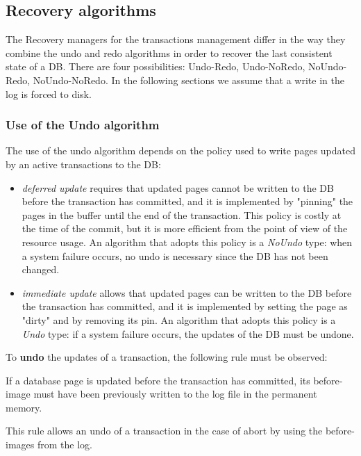 \subsection{Recovery algorithms}
The Recovery managers for the transactions management differ in the way they combine the undo and redo algorithms in order to recover the last consistent state of a DB. There are four possibilities: Undo-Redo, Undo-NoRedo, NoUndo-Redo, NoUndo-NoRedo. In the following sections we assume that a write in the log is forced to disk.

\subsubsection{Use of the Undo algorithm}
The use of the undo algorithm depends on the policy used to write pages updated by an active transactions to the DB:

\begin{itemize}

    \item \textit{deferred update} requires that updated pages cannot be written to the DB before the transaction has committed, and it is implemented by "pinning" the pages in the buffer until the end of the transaction. This policy is costly at the time of the commit, but it is more efficient from the point of view of the resource usage. An algorithm that adopts this policy is a \textit{NoUndo} type: when a system failure occurs, no undo is necessary since the DB has not been changed.

    \item \textit{immediate update} allows that updated pages can be written to the DB before the transaction has committed, and it is implemented by setting the page as "dirty" and by removing its pin. An algorithm that adopts this policy is a \textit{Undo} type: if a system failure occurs, the updates of the DB must be undone.
    
\end{itemize}

To \textbf{undo} the updates of a transaction, the following rule must be observed:

\begin{tcolorbox}[title = Undo rule (Write ahead log)]
    If a database page is updated before the transaction has committed, its before-image must have been previously written to the log file in the permanent memory.
\end{tcolorbox}

This rule allows an undo of a transaction in the case of abort by using the before-images from the log.

